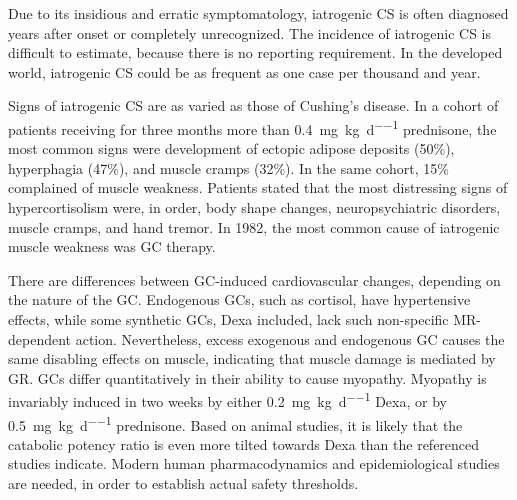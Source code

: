 \documentclass[12pt,english]{report}\usepackage[]{graphicx}\usepackage[]{color}
\begin{document}
Due to its insidious and erratic symptomatology, iatrogenic CS is
often diagnosed years after onset or completely unrecognized\citep{psaras2011demographic}.
The incidence of iatrogenic CS is difficult to estimate, because there
is no reporting requirement. In the developed world, iatrogenic CS
could be as frequent as one case per thousand and year\citep{prague2013cushings}.

Signs of iatrogenic CS are as varied as those of Cushing's disease.
In a cohort of patients receiving for three months more than \SI{0.4}{\milli\gram\per\kilo\gram\per\day}
prednisone, the most common signs were development of ectopic adipose
deposits (50\%), hyperphagia (47\%), and muscle cramps (32\%)\citep{fardet2007corticosteroid-induced}.
In the same cohort, 15\% complained of muscle weakness. Patients stated
that the most distressing signs of hypercortisolism were, in order,
body shape changes, neuropsychiatric disorders, muscle cramps, and
hand tremor. In 1982, the most common cause of iatrogenic muscle weakness
was GC therapy\citep{mastaglia1982adverse}.

There are differences between GC-induced cardiovascular changes, depending
on the nature of the GC. Endogenous GCs, such as cortisol, have hypertensive
effects, while some synthetic GCs, Dexa included, lack such non-specific
MR-dependent action. Nevertheless, excess exogenous and endogenous
GC causes the same disabling effects on muscle\citep{douglass1992myopathy},
indicating that muscle damage is mediated by GR. GCs differ quantitatively
in their ability to cause myopathy. Myopathy is invariably induced
in two weeks by either \SI{0.2}{\milli\gram\per\kilo\gram\per\day}
Dexa\citep{batchelor1997steroid}, or by \SI{0.5}{\milli\gram\per\kilo\gram\per\day}
prednisone\citep{bowyer1985steroid}. Based on animal studies, it
is likely that the catabolic potency ratio is even more tilted towards
Dexa than the referenced studies indicate. Modern human pharmacodynamics
and epidemiological studies are needed, in order to establish actual
safety thresholds.
\end{document}
